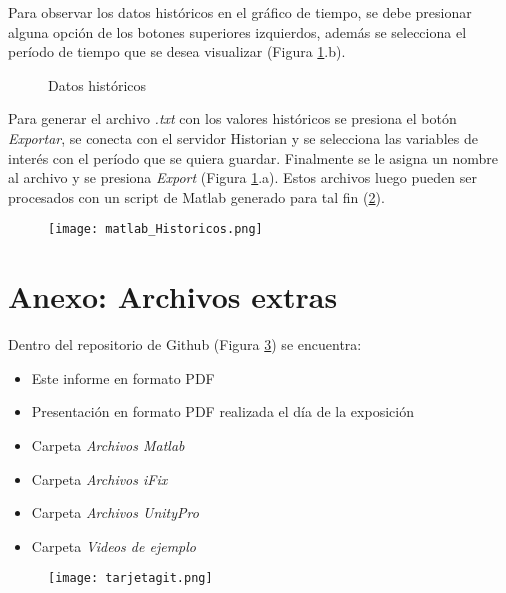 Para observar los datos históricos en el gráfico de tiempo, se debe presionar alguna opción de los botones superiores izquierdos, además se selecciona el período de tiempo que se desea visualizar (Figura \ref{fig:scada3a3}.b).


\begin{figure}[h!]
	\centering
	\caption{Datos históricos} \label{fig:scada3a3}
\end{figure}

Para generar el archivo \textit{.txt} con los valores históricos se presiona el botón \textit{Exportar}, se conecta con el servidor Historian y se selecciona las variables de interés con el período que se quiera guardar.
Finalmente se le asigna un nombre al archivo y se presiona \textit{Export} (Figura \ref{fig:scada3a3}.a).
Estos archivos luego pueden ser procesados con un script de Matlab generado para tal fin (\ref{fig:matlabH}).


\begin{figure}[h!]
	\centering
	\texttt{[image: matlab\_Historicos.png]}
	\label{fig:matlabH}
\end{figure}

\clearpage
\newpage

\section{Anexo: Archivos extras}
Dentro del repositorio de Github (Figura \ref{fig:tarjetagit}) se encuentra:
\begin{itemize}
	\item Este informe en formato PDF
	\item Presentación en formato PDF realizada el día de la exposición
	\item Carpeta \textit{Archivos Matlab}
	\item Carpeta \textit{Archivos iFix}
	\item Carpeta \textit{Archivos UnityPro}
	\item Carpeta \textit{Videos de ejemplo}
\end{itemize}


\begin{figure}[h!]
	\centering
	\texttt{[image: tarjetagit.png]}
	\label{fig:tarjetagit}
\end{figure}